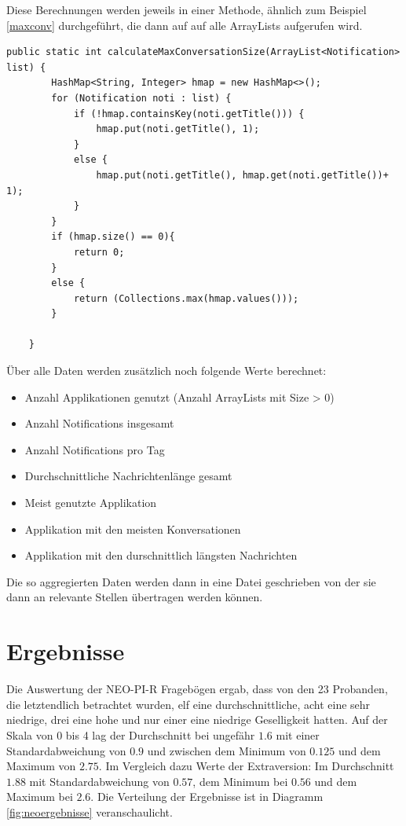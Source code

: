 Diese Berechnungen werden jeweils in einer Methode, ähnlich zum Beispiel \ref{maxconv} durchgeführt, die dann auf auf alle ArrayLists aufgerufen wird.


\begin{lstlisting}[frame=single, caption =  calculateMaxConversationSize(), label=maxconv] 
    public static int calculateMaxConversationSize(ArrayList<Notification> list) {
        HashMap<String, Integer> hmap = new HashMap<>();
        for (Notification noti : list) {
            if (!hmap.containsKey(noti.getTitle())) {
                hmap.put(noti.getTitle(), 1);
            }
            else {
                hmap.put(noti.getTitle(), hmap.get(noti.getTitle())+ 1);
            }
        }
        if (hmap.size() == 0){
            return 0;
        }
        else {
            return (Collections.max(hmap.values()));
        }

    }
\end{lstlisting}


Über alle Daten werden zusätzlich noch folgende Werte berechnet:

\begin{itemize}
  \item Anzahl Applikationen genutzt (Anzahl ArrayLists mit Size > 0)
  \item Anzahl Notifications insgesamt
  \item Anzahl Notifications pro Tag
  \item Durchschnittliche Nachrichtenlänge gesamt
  \item Meist genutzte Applikation
  \item Applikation mit den meisten Konversationen
  \item Applikation mit den durschnittlich längsten Nachrichten  
\end{itemize}

Die so aggregierten Daten werden dann in eine Datei geschrieben von der sie dann an relevante Stellen übertragen werden können.

\section{Ergebnisse}

Die Auswertung der NEO-PI-R Fragebögen ergab, dass von den 23 Probanden, die letztendlich betrachtet wurden, elf eine durchschnittliche, acht eine sehr niedrige, drei eine hohe und nur einer eine niedrige Geselligkeit hatten.
Auf der Skala von 0 bis 4 lag der Durchschnitt bei ungefähr $1.6$ mit einer Standardabweichung von $0.9$ und zwischen dem Minimum von $0.125$ und dem Maximum von $2.75$.
Im Vergleich dazu Werte der Extraversion:
Im Durchschnitt $1.88$ mit Standardabweichung von $0.57$, dem Minimum bei $0.56$ und dem Maximum bei $2.6$.
Die Verteilung der Ergebnisse ist in Diagramm \ref{fig:neoergebnisse} veranschaulicht.

